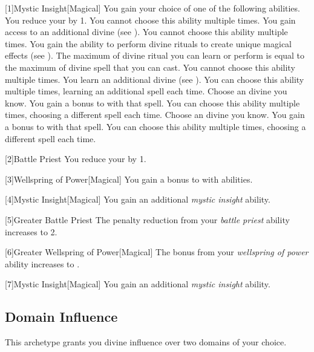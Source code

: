         [1]{Mystic Insight}[Magical]
        You gain your choice of one of the following abilities.
        {
             You reduce your  by 1.
                You cannot choose this ability multiple times.
             You gain access to an additional divine  (see ).
                You cannot choose this ability multiple times.
             You gain the ability to perform divine rituals to create unique magical effects (see ).
                The maximum  of divine ritual you can learn or perform is equal to the maximum  of divine spell that you can cast.
                You cannot choose this ability multiple times.
             You learn an additional divine  (see ).
                You can choose this ability multiple times, learning an additional spell each time.
             Choose an divine  you know.
                You gain a  bonus to  with that spell.
                You can choose this ability multiple times, choosing a different spell each time.
             Choose an divine  you know.
                You gain a  bonus to  with that spell.
                You can choose this ability multiple times, choosing a different spell each time.
        }

        [2]{Battle Priest} You reduce your  by 1.

        [3]{Wellspring of Power}[Magical]
        You gain a  bonus to  with  abilities.

        [4]{Mystic Insight}[Magical]
        You gain an additional \textit{mystic insight} ability.

        [5]{Greater Battle Priest} The penalty reduction from your \textit{battle priest} ability increases to 2.

        [6]{Greater Wellspring of Power}[Magical]
        The bonus from your \textit{wellspring of power} ability increases to .

        [7]{Mystic Insight}[Magical]
        You gain an additional \textit{mystic insight} ability.

    \subsection{Domain Influence}
        This archetype grants you divine influence over two domains of your choice.

